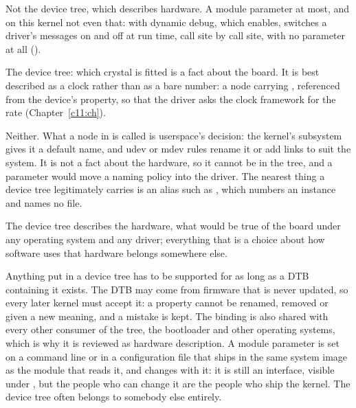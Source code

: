  Not the device tree, which describes hardware. A module parameter at most, and on this
kernel not even that:  with dynamic debug, which  enables,
switches a driver's messages on and off at run time, call site by call site, with no parameter at
all ().

 The device tree: which crystal is fitted is a fact about the board. It is best described
as a clock rather than as a bare number: a  node carrying ,
referenced from the device's  property, so that the driver asks the clock framework
for the rate (Chapter~\ref{c11:ch}).

 Neither. What a node in  is called is userspace's decision: the kernel's
subsystem gives it a default name, and udev or mdev rules rename it or add links to suit the
system. It is not a fact about the hardware, so it cannot be in the tree, and a parameter would move
a naming policy into the driver. The nearest thing a device tree legitimately carries is an alias
such as , which numbers an instance and names no file.

 The device tree describes the hardware, what would be true of the board under any
operating system and any driver; everything that is a choice about how software uses that hardware
belongs somewhere else.

 Anything put in a device tree has to be supported for as long as a DTB containing it
exists. The DTB may come from firmware that is never updated, so every later kernel must accept it:
a property cannot be renamed, removed or given a new meaning, and a mistake is kept. The binding is
also shared with every other consumer of the tree, the bootloader and other operating systems,
which is why it is reviewed as hardware description. A module parameter is set on a command line or
in a configuration file that ships in the same system image as the module that reads it, and
changes with it: it is still an interface, visible under , but the people who can
change it are the people who ship the kernel. The device tree often belongs to somebody else
entirely.


